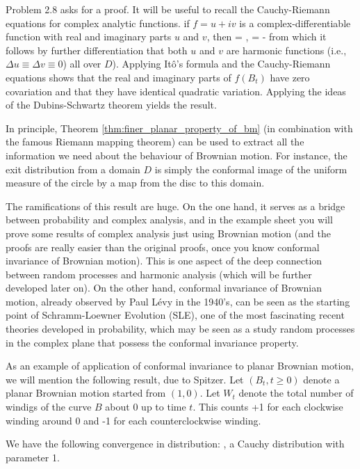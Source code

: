 Problem 2.8 asks for a proof. It will be useful to recall the Cauchy-Riemann equations for complex analytic functions. if $f = u + iv$ is a complex-differentiable function with real and imaginary parts $u$ and $v$, then 
\be
{} = ,\quad\quad {} = -
\ee
from which it follows by further differentiation that both $u$ and $v$ are harmonic functions (i.e., $\Delta u \equiv \Delta v \equiv 0$) all over $D$). Applying It\^o's formula and the Cauchy-Riemann equations shows that the real and imaginary parts of $f(B_t)$ have zero covariation and that they have identical quadratic variation. Applying the ideas of the Dubins-Schwartz theorem yields the result. 

In principle, Theorem \ref{thm:finer_planar_property_of_bm} (in combination with the famous Riemann mapping theorem) can be used to extract all the information we need about the behaviour of Brownian motion. For instance, the exit distribution from a domain $D$ is simply the conformal image of the
uniform measure of the circle by a map from the disc to this domain. 

\begin{remark}
The ramifications of this result are huge. On the one hand, it serves as a bridge between probability and complex analysis, and in the example sheet you will prove some results of complex analysis just using Brownian motion (and the proofs are really easier than the original proofs, once you know conformal invariance of Brownian motion). This is one aspect of the deep connection between random processes and harmonic analysis (which will be further developed later on). On the other hand, conformal invariance of Brownian motion, already observed by Paul L\'evy in the 1940's, can be seen as the starting point of
Schramm-Loewner Evolution (SLE), one of the most fascinating recent theories developed in probability, which may be seen as a study random processes in the complex plane that possess the conformal invariance property.

As an example of application of conformal invariance to planar Brownian motion, we will mention the following result, due to Spitzer. Let $(B_t, t \geq 0)$ denote a planar Brownian motion started from $(1, 0)$. Let $W_t$ denote the total number of windigs of the curve $B$ about 0 up to time $t$. This counts +1 for each clockwise winding around 0 and -1 for each counterclockwise winding.
\end{remark}

\begin{theorem}\label{thm:spitzer_winding_number}
We have the following convergence in distribution:
\be
{}  \sC,
\ee
a Cauchy distribution with parameter 1.
\end{theorem}

